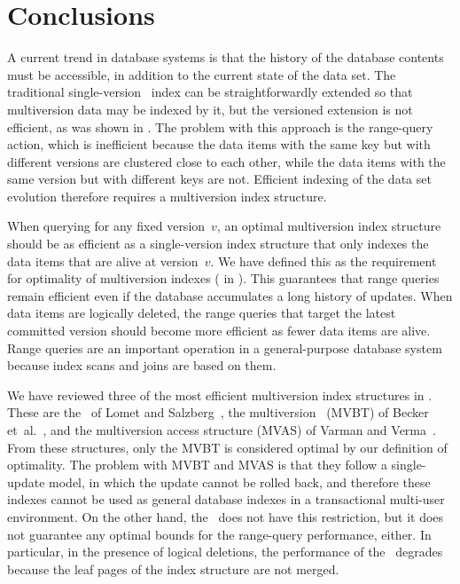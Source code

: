 \chapter{Conclusions}
\label{chapter:conclusions}

A current trend in database systems is that the history of the database
contents must be accessible, in addition to the current state of the data
set.
The traditional single-version \Btree\ index can be straightforwardly
extended so that multiversion data may be indexed by it, but the versioned
extension is not efficient, as was shown in .
The problem with this approach is the range-query action, which is
inefficient because the data items with the same key but with different
versions are clustered close to each other, while the data items with the
same version but with different keys are not.
Efficient indexing of the data set evolution therefore requires a
multiversion index structure.
 
When querying for any fixed version~$v$, an optimal multiversion index
structure should be as efficient as a single-version index structure that
only indexes the data items that are alive at version~$v$. 
We have defined this as the requirement for optimality
of multiversion indexes ( in
).
This guarantees that range queries remain efficient even if the database
accumulates a long history of updates.
When data items are logically deleted, the range queries that target the
latest committed version should become more efficient as fewer data items are
alive.
Range queries are an important operation in a general-purpose database
system because index scans and joins are based on them.

We have reviewed three of the most efficient multiversion index structures in
.
These are the \TSBtree\ of Lomet and
Salzberg~\cite{lomet:1989:tsb,lomet:1990:tsb-performance}, the multiversion
\Btree\ (MVBT) of Becker et~al.~\cite{becker:1993:optimal,becker:1996:mvbt},
and the multiversion access structure (MVAS)
of Varman and Verma~\cite{varman:1997:multiversion}.
From these structures, only the MVBT is considered optimal by our definition
of optimality.
The problem with MVBT and MVAS is that they follow a single-update model, in
which the update cannot be rolled back, and therefore these indexes cannot
be used as general database indexes in a transactional multi-user
environment.
On the other hand, the \TSBtree\ does not have this restriction, but it does
not guarantee any optimal bounds for the range-query performance, either.
In particular, in the presence of logical deletions, the performance of the
\TSBtree\ degrades because the leaf pages of the index structure are not
merged.

